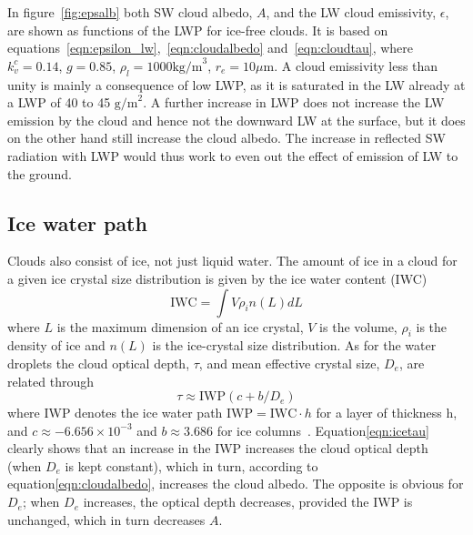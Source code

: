 In figure~\ref{fig:epsalb} both SW cloud albedo, $A$, and the LW cloud emissivity, $\epsilon$, are shown as functions of the LWP for ice-free clouds. It is based on equations~\ref{eqn:epsilon_lw},~\ref{eqn:cloudalbedo} and~\ref{eqn:cloudtau}, where $k_v^c=0.14$, $g=0.85$, $\rho_l=1000\text{kg/m}^3$, $r_e = 10\mu\text{m}$. A cloud emissivity less than unity is mainly a consequence of low LWP, as it is saturated in the LW already at a LWP of 40 to 45 $\text{g/m}^2$. A further increase in LWP does not increase the LW emission by the cloud and hence not the downward LW at the surface, but it does on the other hand still increase the cloud albedo. The increase in reflected SW radiation with LWP would thus work to even out the effect of emission of LW to the ground. 

\subsection{Ice water path}
 Clouds also consist of ice, not just liquid water. The amount of ice in a cloud for a given ice crystal size distribution is given by the ice water content (IWC)~\cite{Liou2002}
\begin{equation}
\text{IWC} = \int V \rho_i n(L)dL
\end{equation}
where $L$ is the maximum dimension of an ice crystal, $V$ is the volume, $\rho_i$ is the density of ice and $n(L)$ is the ice-crystal size distribution. As for the water droplets the cloud optical depth, $\tau$, and mean effective crystal size, $D_e$, are related through
\begin{equation}
\tau \approx \text{IWP}(c + b/D_e)
\label{eqn:icetau}
\end{equation}
where IWP denotes the ice water path $\text{IWP} = \text{IWC} \cdot h$ for a layer of thickness h, and $c \approx -6.656 \times 10^{-3}$ and $b \approx 3.686$ for ice columns~\citep{Liou2002}. Equation\ref{eqn:icetau} clearly shows that an increase in the IWP increases the cloud optical depth (when $D_e$ is kept constant), which in turn, according to equation\ref{eqn:cloudalbedo}, increases the cloud albedo. The opposite is obvious for $D_e$; when $D_e$ increases, the optical depth decreases, provided the IWP is unchanged, which in turn decreases $A$.

